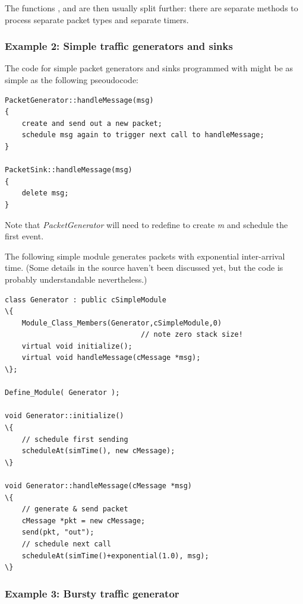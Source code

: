 The functions , 
and  are then usually split further: there are separate
methods to process separate packet types and separate timers.


\subsubsection{Example 2: Simple traffic generators and sinks}


The code for simple packet generators and sinks programmed with  might
be as simple as the following pseoudocode:

\begin{verbatim}
PacketGenerator::handleMessage(msg)
{
    create and send out a new packet;
    schedule msg again to trigger next call to handleMessage;
}

PacketSink::handleMessage(msg)
{
    delete msg;
}
\end{verbatim}

Note that \textit{PacketGenerator} will need to redefine 
to create \textit{m} and schedule the first event.

The following simple module generates packets with exponential
inter-arrival time. (Some details in the source haven't been
discussed yet, but the code is probably understandable nevertheless.)


\begin{Verbatim}[commandchars=\\\{\}]
class Generator : public cSimpleModule
\{
    Module_Class_Members(Generator,cSimpleModule,0)
                                // note zero stack size!
    virtual void initialize();
    virtual void handleMessage(cMessage *msg);
\};

Define_Module( Generator );

void Generator::initialize()
\{
    // schedule first sending
    scheduleAt(simTime(), new cMessage);
\}

void Generator::handleMessage(cMessage *msg)
\{
    // generate & send packet
    cMessage *pkt = new cMessage;
    send(pkt, "out");
    // schedule next call
    scheduleAt(simTime()+exponential(1.0), msg);
\}
\end{Verbatim}



\subsubsection{Example 3: Bursty traffic generator}


